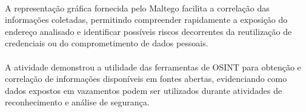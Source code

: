 \paragraph{}
A representação gráfica fornecida pelo Maltego facilita a correlação das
informações coletadas, permitindo compreender rapidamente a exposição do
endereço analisado e identificar possíveis riscos decorrentes da reutilização
de credenciais ou do comprometimento de dados pessoais.

\paragraph{}
A atividade demonstrou a utilidade das ferramentas de OSINT para obtenção e
correlação de informações disponíveis em fontes abertas, evidenciando como
dados expostos em vazamentos podem ser utilizados durante atividades de
reconhecimento e análise de segurança.
